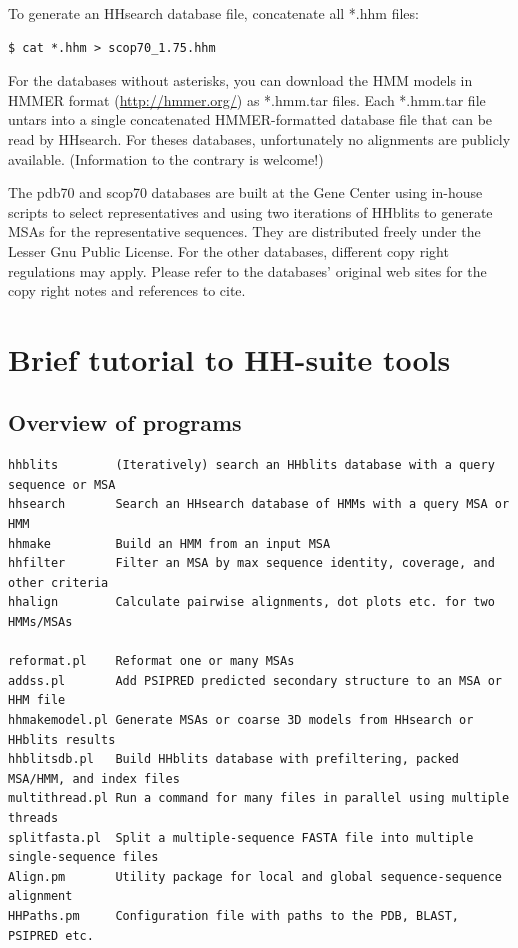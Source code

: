 \documentclass[11pt,a4paper]{article}
\begin{document}
To generate an HHsearch database file, concatenate all *.hhm files:
\begin{verbatim}
$ cat *.hhm > scop70_1.75.hhm
\end{verbatim}
For the databases without asterisks, you can download the HMM models in HMMER format (\url{http://hmmer.org/})
as *.hmm.tar files. Each *.hmm.tar file untars into a single concatenated HMMER-formatted 
database file that can be read by HHsearch. For theses databases, unfortunately no 
alignments are publicly available. (Information to the contrary is welcome!) 

The pdb70 and scop70 databases are built at the Gene Center using in-house scripts 
to select representatives and using two iterations of HHblits to generate MSAs for the 
representative sequences. They are distributed freely under the Lesser Gnu Public License. 
For the other databases, different copy right regulations may apply. 
Please refer to the databases' original web sites for the copy right notes and 
references to cite.


\section{Brief tutorial to HH-suite tools}

\subsection{Overview of programs}

\small 
\begin{verbatim}
hhblits        (Iteratively) search an HHblits database with a query sequence or MSA
hhsearch       Search an HHsearch database of HMMs with a query MSA or HMM
hhmake         Build an HMM from an input MSA 
hhfilter       Filter an MSA by max sequence identity, coverage, and other criteria
hhalign        Calculate pairwise alignments, dot plots etc. for two HMMs/MSAs

reformat.pl    Reformat one or many MSAs
addss.pl       Add PSIPRED predicted secondary structure to an MSA or HHM file
hhmakemodel.pl Generate MSAs or coarse 3D models from HHsearch or HHblits results	
hhblitsdb.pl   Build HHblits database with prefiltering, packed MSA/HMM, and index files
multithread.pl Run a command for many files in parallel using multiple threads
splitfasta.pl  Split a multiple-sequence FASTA file into multiple single-sequence files
Align.pm       Utility package for local and global sequence-sequence alignment
HHPaths.pm     Configuration file with paths to the PDB, BLAST, PSIPRED etc.
\end{verbatim} 
\normalsize
\end{document}
